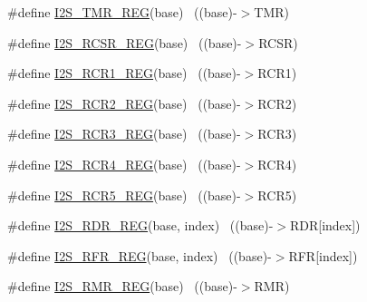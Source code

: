\begin{DoxyCompactItemize}
\item 
\#define \hyperlink{group___i2_s___register___accessor___macros_ga1ca2b4f31362bf93e985588595f2dbd1}{I2\+S\+\_\+\+T\+M\+R\+\_\+\+R\+EG}(base)                                            ~((base)-\/$>$T\+MR)
\item 
\#define \hyperlink{group___i2_s___register___accessor___macros_gabb9a8ee9dfb5ae4b28895d4cb285ae16}{I2\+S\+\_\+\+R\+C\+S\+R\+\_\+\+R\+EG}(base)                                          ~((base)-\/$>$R\+C\+SR)
\item 
\#define \hyperlink{group___i2_s___register___accessor___macros_ga48a001dfc8fcd9cc418a17a3d0223baf}{I2\+S\+\_\+\+R\+C\+R1\+\_\+\+R\+EG}(base)                                          ~((base)-\/$>$R\+C\+R1)
\item 
\#define \hyperlink{group___i2_s___register___accessor___macros_ga5d3d61d720b40d692a114a1e98fd274e}{I2\+S\+\_\+\+R\+C\+R2\+\_\+\+R\+EG}(base)                                          ~((base)-\/$>$R\+C\+R2)
\item 
\#define \hyperlink{group___i2_s___register___accessor___macros_gad37ff97af99ab3c5fd2e44ab0eccb259}{I2\+S\+\_\+\+R\+C\+R3\+\_\+\+R\+EG}(base)                                          ~((base)-\/$>$R\+C\+R3)
\item 
\#define \hyperlink{group___i2_s___register___accessor___macros_ga2979fce419e19c97551d0b5e0b0a61d4}{I2\+S\+\_\+\+R\+C\+R4\+\_\+\+R\+EG}(base)                                          ~((base)-\/$>$R\+C\+R4)
\item 
\#define \hyperlink{group___i2_s___register___accessor___macros_ga48e6d5a9cf36845fb8ccbbfe785f07a8}{I2\+S\+\_\+\+R\+C\+R5\+\_\+\+R\+EG}(base)                                          ~((base)-\/$>$R\+C\+R5)
\item 
\#define \hyperlink{group___i2_s___register___accessor___macros_ga18b3e6efd2a957d910429a72b273bea9}{I2\+S\+\_\+\+R\+D\+R\+\_\+\+R\+EG}(base,  index)                                ~((base)-\/$>$R\+DR\mbox{[}index\mbox{]})
\item 
\#define \hyperlink{group___i2_s___register___accessor___macros_ga0c209378f864f66e1f88468118ee87aa}{I2\+S\+\_\+\+R\+F\+R\+\_\+\+R\+EG}(base,  index)                                ~((base)-\/$>$R\+FR\mbox{[}index\mbox{]})
\item 
\#define \hyperlink{group___i2_s___register___accessor___macros_ga11a80a8a47223925c708e60a75377225}{I2\+S\+\_\+\+R\+M\+R\+\_\+\+R\+EG}(base)                                            ~((base)-\/$>$R\+MR)
\item 

\end{DoxyCompactItemize}
